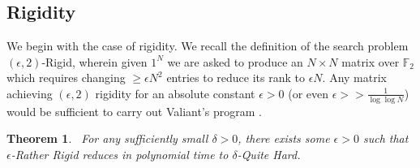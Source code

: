 \documentclass[11pt]{article}
\newtheorem{theorem}{Theorem}
\newtheorem{definition}{Definition}
\begin{document}
\subsection{Rigidity}
We begin with the case of rigidity. We recall the definition of the search problem {\sc $(\epsilon,2)$-Rigid}, wherein given $1^N$ we are asked to produce an $N \times N$ matrix over $\mathbb{F}_2$ which requires changing $\geq \epsilon N^2$ entries to reduce its rank to $\epsilon N$. Any matrix achieving $(\epsilon,2)$ rigidity for an absolute constant $\epsilon >0$ (or even $\epsilon >> \frac{1}{\log \log N}$) would be sufficient to carry out Valiant's program \cite{Valiant}.



\begin{theorem}~\label{thm:rigidity-circuit}
For any sufficiently small $\delta > 0$, there exists some $\epsilon > 0$ such that {\sc $\epsilon$-Rather Rigid} reduces in polynomial time to {\sc $\delta$-Quite Hard}.
\end{theorem}
\end{document}
